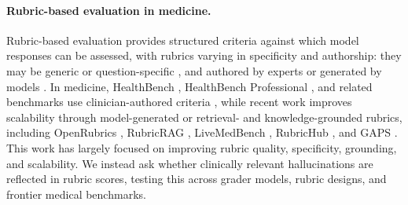 \documentclass{article}
\begin{document}
\paragraph{Rubric-based evaluation in medicine.} Rubric-based evaluation provides structured criteria against which model responses can be assessed, with rubrics varying in specificity and authorship: they may be generic \citep{ye2024flaskfinegrainedlanguagemodel} or question-specific \citep{kim2024prometheus}, and authored by experts or generated by models \citep{chen_automated_2026}. In medicine, HealthBench \citep{arorahealthbench2025}, HealthBench Professional \citep{hicks2026healthbench}, and related benchmarks use clinician-authored criteria \citep{sharma2025researchrubricsbenchmarkpromptsrubrics, shi-etal-2026-plawbench}, while recent work improves scalability through model-generated or retrieval- and knowledge-grounded rubrics, including OpenRubrics \citep{liu2026openrubricsscalablesyntheticrubric}, RubricRAG \citep{dhole_rubricrag_2026}, LiveMedBench \citep{yan_livemedbench_2026}, RubricHub \citep{li-etal-2026-rubrichub}, and GAPS \citep{chen_gaps_2025}. This work has largely focused on improving rubric quality, specificity, grounding, and scalability. We instead ask whether clinically relevant hallucinations are reflected in rubric scores, testing this across grader models, rubric designs, and frontier medical benchmarks.
\end{document}
